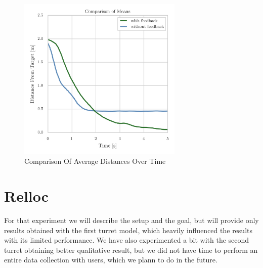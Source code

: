 \begin{figure}
	\centering
	\includegraphics[width=0.7\textwidth]{img/avgDistance.png}%
	\caption{Comparison Of Average Distances Over Time}
	\label{fig:avgDistance}
\end{figure}

\section{Relloc}
For that experiment we will describe the setup and the goal, but will provide only results obtained with the first turret model, which heavily influenced the results with its limited performance. We have also experimented a bit with the second turret obtaining better qualitative result, but we did not have time to perform an entire data collection with users, which we plann to do in the future.
